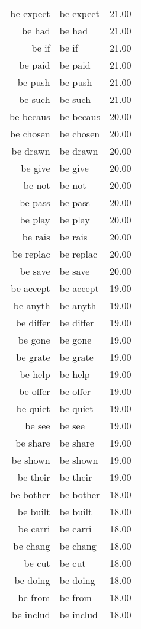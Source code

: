 \begin{table}[ht]
\begin{tabular}{rlr}
  be expect & be expect & 21.00 \\ 
  be had & be had & 21.00 \\ 
  be if & be if & 21.00 \\ 
  be paid & be paid & 21.00 \\ 
  be push & be push & 21.00 \\ 
  be such & be such & 21.00 \\ 
  be becaus & be becaus & 20.00 \\ 
  be chosen & be chosen & 20.00 \\ 
  be drawn & be drawn & 20.00 \\ 
  be give & be give & 20.00 \\ 
  be not & be not & 20.00 \\ 
  be pass & be pass & 20.00 \\ 
  be play & be play & 20.00 \\ 
  be rais & be rais & 20.00 \\ 
  be replac & be replac & 20.00 \\ 
  be save & be save & 20.00 \\ 
  be accept & be accept & 19.00 \\ 
  be anyth & be anyth & 19.00 \\ 
  be differ & be differ & 19.00 \\ 
  be gone & be gone & 19.00 \\ 
  be grate & be grate & 19.00 \\ 
  be help & be help & 19.00 \\ 
  be offer & be offer & 19.00 \\ 
  be quiet & be quiet & 19.00 \\ 
  be see & be see & 19.00 \\ 
  be share & be share & 19.00 \\ 
  be shown & be shown & 19.00 \\ 
  be their & be their & 19.00 \\ 
  be bother & be bother & 18.00 \\ 
  be built & be built & 18.00 \\ 
  be carri & be carri & 18.00 \\ 
  be chang & be chang & 18.00 \\ 
  be cut & be cut & 18.00 \\ 
  be doing & be doing & 18.00 \\ 
  be from & be from & 18.00 \\ 
  be includ & be includ & 18.00 \\ 

\end{tabular}
\end{table}
